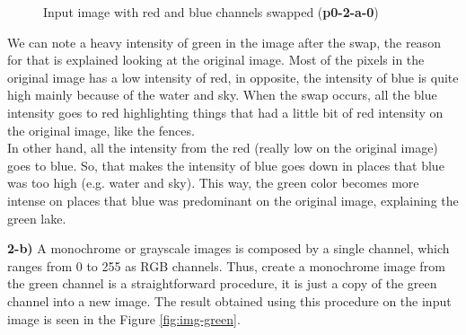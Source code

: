 \documentclass[12pt,a4paper]{article}
\begin{document}
\begin{figure}[!h]
	\centering
	{%
		\setlength{\fboxsep}{1pt}%
		\setlength{\fboxrule}{1pt}%
	}%
	\caption{Input image with red and blue channels swapped (\textbf{p0-2-a-0})}
	\label{fig:p0-2-a-0}
\end{figure}

We can note a heavy intensity of green in the image after the swap, the reason for that is explained looking at the original image. Most of the pixels in the original image has a low intensity of red, in opposite, the intensity of blue is quite high mainly because of the water and sky. When the swap occurs, all the blue intensity goes to red highlighting things that had a little bit of red intensity on the original image, like the fences. \\

In other hand, all the intensity from the red (really low on the original image) goes to blue. So, that makes the intensity of blue goes down in places that blue was too high (e.g. water and sky). This way, the green color becomes more intense on places that blue was predominant on the original image, explaining the green lake.\\

\newpage


\textbf{2-b) } A monochrome or grayscale images is composed by a single channel, which ranges from 0 to 255 as RGB channels. Thus, create a monochrome image from the green channel is a straightforward procedure, it is just a copy of the green channel into a new image. The result obtained using this procedure on the input image is seen in the Figure \ref{fig:img-green}.
\end{document}
